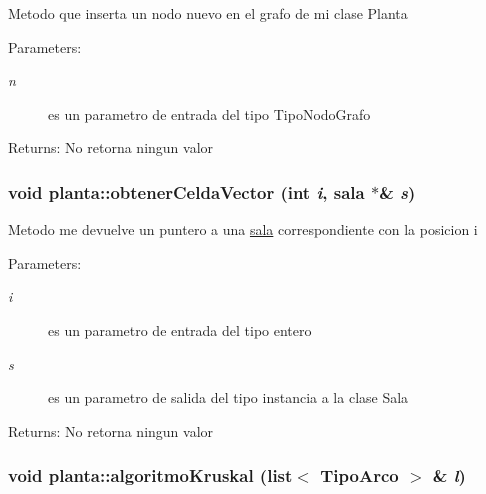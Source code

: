 Metodo que inserta un nodo nuevo en el grafo de mi clase Planta \begin{Desc}
\item[Parameters:]
\begin{description}
\item[{\em n}]es un parametro de entrada del tipo TipoNodoGrafo \end{description}
\end{Desc}
\begin{Desc}
\item[Returns:]No retorna ningun valor \end{Desc}
\hypertarget{classplanta_c97835a31f875ecdc01f33517dfc71d4}{
\subsubsection[obtenerCeldaVector]{\setlength{\rightskip}{0pt plus 5cm}void planta::obtenerCeldaVector (int {\em i}, \/  {\bf sala} $\ast$\& {\em s})}}
\label{classplanta_c97835a31f875ecdc01f33517dfc71d4}


Metodo me devuelve un puntero a una \hyperlink{classsala}{sala} correspondiente con la posicion i \begin{Desc}
\item[Parameters:]
\begin{description}
\item[{\em i}]es un parametro de entrada del tipo entero \item[{\em s}]es un parametro de salida del tipo instancia a la clase Sala \end{description}
\end{Desc}
\begin{Desc}
\item[Returns:]No retorna ningun valor \end{Desc}
\hypertarget{classplanta_af4bebbde71513fa6496c3f60d0214f3}{
\subsubsection[algoritmoKruskal]{\setlength{\rightskip}{0pt plus 5cm}void planta::algoritmoKruskal (list$<$ TipoArco $>$ \& {\em l})}}
\label{classplanta_af4bebbde71513fa6496c3f60d0214f3}


